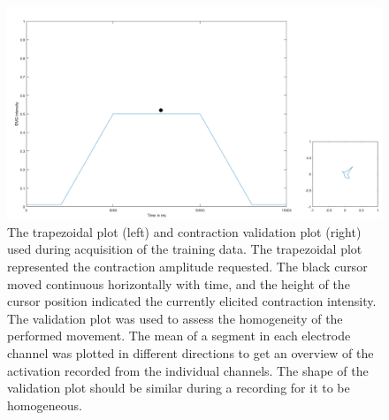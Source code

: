 \begin{figure}[H]                 
	\includegraphics[width=1\textwidth]{figures/trapezoid}  
	\caption{The trapezoidal plot (left) and contraction validation plot (right) used during acquisition of the training data. The trapezoidal plot represented the contraction amplitude requested. The black cursor moved continuous horizontally with time, and the height of the cursor position indicated the currently elicited contraction intensity. The validation plot was used to assess the homogeneity of the performed movement. The mean of a segment in each electrode channel was plotted in different directions to get an overview of the activation recorded from the individual channels. The shape of the validation plot should be similar during a recording for it to be homogeneous.}
	\label{fig:GUI} 
\end{figure}
\vspace{-1em}

